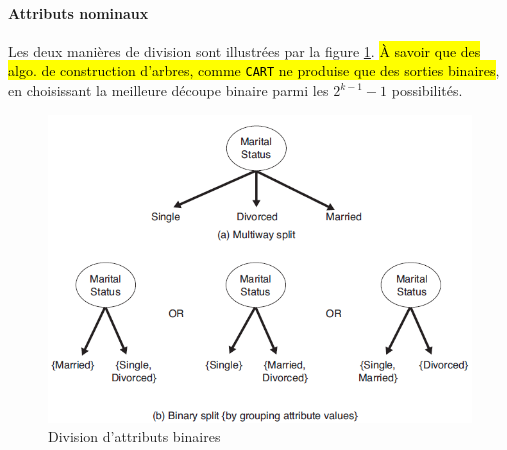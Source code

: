 \documentclass[letterpaper, 12pt]{article}
\begin{document}
			\paragraph{Attributs nominaux} Les deux manières de division
				sont illustrées par la figure \ref{fig:tree:nominal}. 
				\hl{\`A savoir que des algo. de construction d'arbres, comme
				\texttt{CART} ne produise que des sorties binaires}, en
				choisissant la meilleure découpe binaire parmi les
				$2^{k-1} -1$ possibilités.\\
				\begin{minipage}{0.45\textwidth}
					\begin{figure}[H]
						\centering
						\includegraphics[scale=0.65]{Images/tree_nominal.png}
						\caption{Division d'attributs binaires}
						\label{fig:tree:nominal}
					\end{figure}\noindent
				\end{minipage}\hfill
\end{document}
